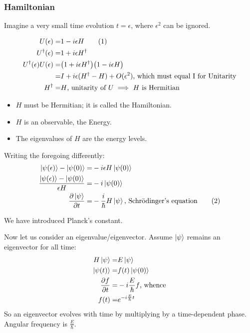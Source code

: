 \documentclass[]{article}
\newcommand\numberthis{\addtocounter{equation}{1}\tag{\theequation}}
\begin{document}
\subsubsection{Hamiltonian}

Imagine a very small time evolution $t=\epsilon$, where $\epsilon^2$ can be ignored.

\begin{align*}
	U(\epsilon) =& 1 - i \epsilon H \numberthis \label{eq:introducing:hamiltonian}\\
	U^\dagger (\epsilon) =&  1 + i \epsilon H^\dagger\\
	U^\dagger (\epsilon)U(\epsilon) =& \big(1 + i \epsilon H^\dagger\big)\big(1 - i \epsilon H\big)\\
	=& I + i\epsilon (H^\dagger-H) + O(\epsilon^2) \text{, which must equal I for Unitarity}\\
	H^\dagger=& H \text{, unitarity of $U\implies$ $H$ is Hermitian}
\end{align*}

\begin{itemize}
	\item $H$ must be Hermitian; it is called the Hamiltonian.
	\item $H$ is an observable, the Energy.
	\item The eigenvalues of $H$ are the energy levels.
\end{itemize}
Writing the foregoing differently:
\begin{align*}
	\ket{\psi(\epsilon)} - \ket{\psi(0)} =& -i \epsilon H \ket{\psi(0)}\\
	\frac{\ket{\psi(\epsilon)} - \ket{\psi(0)}}{\epsilon H } =& -i \ket{\psi(0)}\\
	\frac{\partial \ket{\psi}}{\partial t} =& -\frac{i}{\hbar}  H \ket{\psi} \text{, Schr\"odinger's equation} \numberthis \label{eq:schroedinger}
\end{align*}

We have introduced Planck's constant.

Now let us consider an eigenvalue/eigenvector. Assume $\ket{\psi}$ remains an eigenvector for all time:
\begin{align*}
	H \ket{\psi} =& E \ket{\psi} \\
	\ket{\psi(t)} =& f(t) \ket{\psi(0)}\\
	\frac{\partial f}{\partial t} =&-i \frac{E}{\hbar}f\text{, whence}\\
	f(t) =& e^{-i \frac{E}{\hbar} t}
\end{align*}
So an eigenvector evolves with time by multiplying by a time-dependent phase. Angular frequency is $\frac{E}{\hbar}$.
\end{document}
